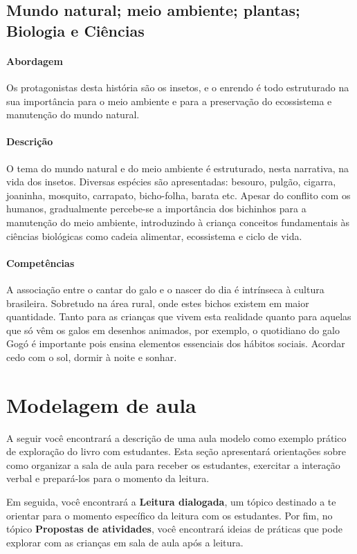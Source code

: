 \documentclass[11pt]{extarticle}
\begin{document}
\subsection{Mundo natural; meio ambiente; plantas; Biologia e Ciências}

\paragraph{Abordagem} Os protagonistas desta história são os insetos, e o enrendo é todo estruturado na sua importância para o meio ambiente e para a preservação do ecossistema e manutenção do mundo natural.

 
\paragraph{Descrição} O tema do mundo natural e do meio ambiente é estruturado, nesta narrativa, na vida dos insetos. Diversas espécies são apresentadas: besouro, pulgão, cigarra, joaninha, mosquito, carrapato, bicho-folha, barata etc. Apesar do conflito com os humanos, gradualmente percebe-se a importância dos bichinhos para a manutenção do meio ambiente, introduzindo à criança conceitos fundamentais às ciências biológicas como cadeia alimentar, ecossistema e ciclo de vida.

\paragraph{Competências} 
A associação entre o cantar do galo e o nascer do dia é intrínseca
à cultura brasileira. Sobretudo na área rural, onde estes bichos
existem em maior quantidade. Tanto para as crianças que vivem
esta realidade quanto para aquelas que só vêm os galos em desenhos
animados, por exemplo, o quotidiano do galo Gogó é importante 
pois ensina elementos essenciais dos hábitos sociais. Acordar cedo com
o sol, dormir à noite e sonhar. 

\section{Modelagem de aula}
A seguir você encontrará a descrição de uma aula modelo como exemplo 
prático de exploração do livro com estudantes. Esta seção apresentará 
orientações sobre como organizar a sala de aula para receber os 
estudantes, exercitar a interação verbal e prepará-los para o 
momento da leitura.

Em seguida, você encontrará a \textbf{Leitura dialogada}, um 
tópico destinado a te orientar para o momento específico da 
leitura com os estudantes. Por fim, no tópico 
\textbf{Propostas de atividades}, você encontrará ideias 
de práticas que pode explorar com as crianças em sala de 
aula após a leitura. 
\end{document}
